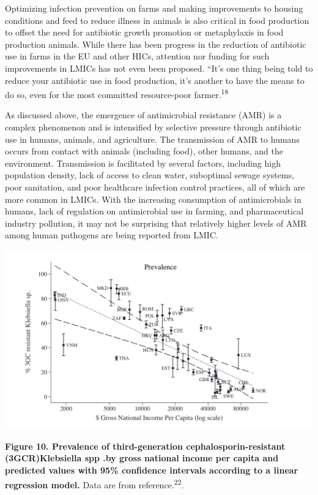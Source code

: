 \documentclass[
]{book}
\begin{document}
Optimizing infection prevention on farms and making improvements to housing conditions and feed to reduce illness in animals is also critical in food production to offset the need for antibiotic growth promotion or metaphylaxis in food production animals. While there has been progress in the reduction of antibiotic use in farms in the EU and other HICs, attention nor funding for such improvements in LMICs has not even been proposed. ``It's one thing being told to reduce your antibiotic use in food production, it's another to have the means to do so, even for the most committed resource-poor farmer.\textsuperscript{18}

As discussed above, the emergence of antimicrobial resistance (AMR) is a complex phenomenon and is intensified by selective pressure through antibiotic use in humans, animals, and agriculture. The transmission of AMR to humans occurs from contact with animals (including food), other humans, and the environment. Transmission is facilitated by several factors, including high population density, lack of access to clean water, suboptimal sewage systems, poor sanitation, and poor healthcare infection control practices, all of which are more common in LMICs. With the increasing consumption of antimicrobials in humans, lack of regulation on antimicrobial use in farming, and pharmaceutical industry pollution, it may not be surprising that relatively higher levels of AMR among human pathogens are being reported from LMIC.

\includegraphics[width=6.25in,height=\textheight]{images/gdp.png}

\textbf{Figure 10. Prevalence of third-generation cephalosporin-resistant (3GCR)Klebsiella spp .by gross national income per capita and predicted values with 95\% confidence intervals according to a linear regression model.} Data are from reference.\textsuperscript{22}.
\end{document}

